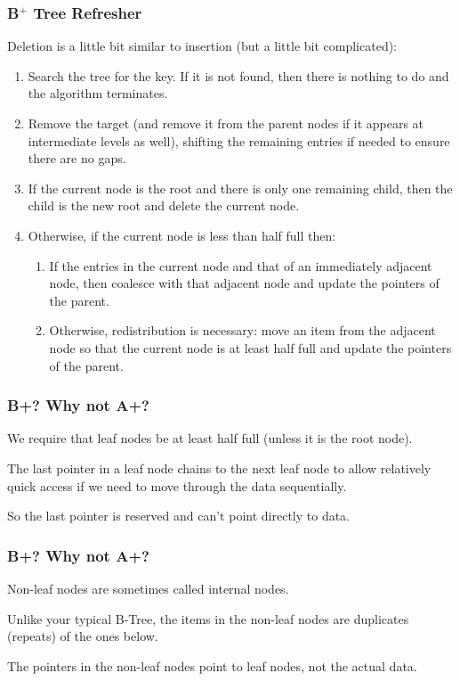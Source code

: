 \begin{frame}
\frametitle{B$^{+}$ Tree Refresher}

Deletion is a little bit similar to insertion (but a little bit complicated):

\begin{enumerate}
	\item Search the tree for the key. If it is not found, then there is nothing to do and the algorithm terminates.
	\item Remove the target (and remove it from the parent nodes if it appears at intermediate levels as well), shifting the remaining entries if needed to ensure there are no gaps.
	\item If the current node is the root and there is only one remaining child, then the child is the new root and delete the current node.
	\item Otherwise, if the current node is less than half full then:
		\begin{enumerate}
			\item If the entries in the current node and that of an immediately adjacent node, then coalesce with that adjacent node and update the pointers of the parent.
			\item Otherwise, redistribution is necessary: move an item from the adjacent node so that the current node is at least half full and update the pointers of the parent.
		\end{enumerate}
\end{enumerate}



\end{frame}


\begin{frame}
\frametitle{B+? Why not A+?}

We require that leaf nodes be at least half full (unless it is the root node).

The last pointer in a leaf node chains to the next leaf node to allow relatively quick access if we need to move through the data sequentially. 

So the last pointer is reserved and can't point directly to data. 

\end{frame}


\begin{frame}
\frametitle{B+? Why not A+?}


Non-leaf nodes are sometimes called internal nodes. 

Unlike your typical B-Tree, the items in the non-leaf nodes are duplicates (repeats) of the ones below. 

The pointers in the non-leaf nodes point to leaf nodes, not the actual data.


\end{frame}

